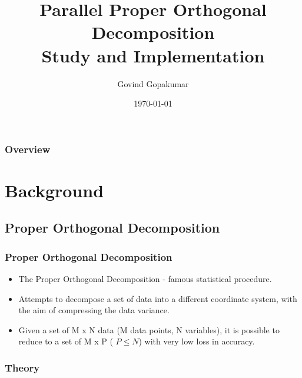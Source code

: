 \documentclass{beamer}
\title[AE471A ]{Parallel Proper Orthogonal Decomposition \\ Study and Implementation } %
\author{Govind Gopakumar} %
\institute[IIT Kanpur] %
{
Indian Institute of Technology, Kanpur \\ %
\medskip
\textit{Roll number 11284} %
}
\date{\today} %
\begin{document}
\begin{frame}
\titlepage %
 \end{frame}

\begin{frame}
\frametitle{Overview} %
\tableofcontents %
\end{frame}


\section{Background}

\subsection{Proper Orthogonal Decomposition}

\begin{frame}
\frametitle{Proper Orthogonal Decomposition}
\begin{itemize}
\item
The Proper Orthogonal Decomposition - famous statistical procedure.\\ 
\item
Attempts to decompose a set of data into a different coordinate system, with the aim of compressing the data variance.
\item
Given a set of M x N data (M data points, N variables), it is possible to reduce to a set of M x P ( $ P \leq N$) with very low loss in accuracy.  
\end{itemize}
\end{frame}


\subsubsection{Theory}
\end{document}
